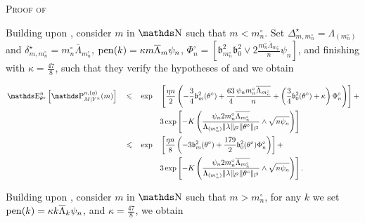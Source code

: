 \begin{pro}{\textsc{Proof of } \\}\label{PROD.4.1}

Building upon , consider $m$ in $\N$ such that $m < m^{\circ}_{n}$.
Set $\Delta^{\star}_{m, m^{\circ}_{n}} = \Lambda_{(m^{\circ}_{n})}$ and $\delta^{\star}_{m, m^{\circ}_{n}} = m^{\circ}_{n}\overline{\Lambda}_{m^{\circ}_{n}}$, $\operatorname{pen}(k) = \kappa m \overline{\Lambda}_{m} \psi_{n}$, $\Phi^{\circ}_{n} = \left[\mathfrak{b}_{m^{\circ}_{n}}^{2}\mathfrak{b}_{0}^{2} \vee 2 \frac{m^{\circ}_{n} \overline{\Lambda}_{m^{\circ}_{n}}}{n} \psi_{n}\right]$, and finishing with $\kappa = \frac{47}{8}$,  such that they verify the hypotheses of  and we obtain

\begin{alignat}{4}
& \E_{\theta^{\circ}}^{n}\left[\P_{M \vert Y^{n}}^{n, (\eta)}(m)\right] && \leq && \exp&&\left[\frac{\eta n}{2} \left(- \frac{3}{4} \mathfrak{b}_{m}^{2}(\theta^{\circ}) + \frac{63}{4} \frac{\psi_{n} m^{\circ}_{n} \overline{\Lambda_{m^{\circ}_{n}}}}{n} + \left(\frac{3}{4} \mathfrak{b}_{0}^{2}(\theta^{\circ}) + \kappa\right) \Phi^{\circ}_{n}\right)\right] +\notag\\
& && && && 3 \exp\left[ -K \left(\frac{\psi_{n} 2 m^{\circ}_{n}\overline{\Lambda_{m^{\circ}_{n}}}}{\Lambda_{(m^{\circ}_{n})} \Vert \lambda \Vert_{l^{2}} \Vert \theta^{\circ} \Vert_{l^{2}}} \wedge \sqrt{n \psi_{n}} \right)\right]\notag\\
& && \leq &&\exp&&\left[\frac{\eta n}{8} \left(- 3 \mathfrak{b}_{m}^{2}(\theta^{\circ}) + \frac{179}{2} \mathfrak{b}_{0}^{2}(\theta^{\circ}) \Phi^{\circ}_{n}\right)\right] +\notag\\
& && && && 3 \exp\left[ -K \left(\frac{\psi_{n} 2 m^{\circ}_{n}\overline{\Lambda_{m^{\circ}_{n}}}}{\Lambda_{(m^{\circ}_{n})} \Vert \lambda \Vert_{l^{2}} \Vert \theta^{\circ} \Vert_{l^{2}}} \wedge \sqrt{n \psi_{n}} \right)\right].\label{EQD.24}
\end{alignat}

\medskip

Building upon , consider $m$ in $\N$ such that $m > m^{\circ}_{n}$, for any $k$ we set $\operatorname{pen}(k) = \kappa k \overline{\Lambda}_{k} \psi_{n}$, and $\kappa = \frac{47}{8}$, we obtain


\end{pro}
